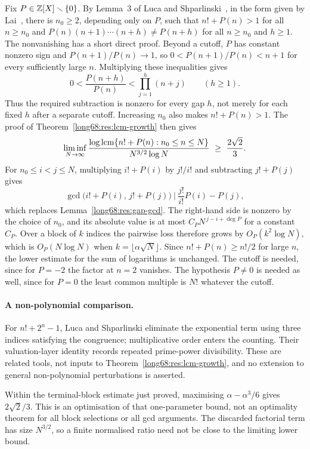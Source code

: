 \documentclass[11pt]{article}
\begin{document}
\begin{remark}
Fix $P\in\mathbb{Z}[X]\smallsetminus\{0\}$.  By Lemma~3 of Luca and
Shparlinski~\cite{luca-shparlinski}, in the form given by
Lai~\cite[Lemma~2.1]{lai}, there is $n_0\ge2$, depending only on $P$, such
that $n!+P(n)>1$ for all $n\ge n_0$ and $P(n)(n+1)\cdots(n+h)\ne P(n+h)$ for
all $n\ge n_0$ and $h\ge1$. The nonvanishing has a short direct proof.
Beyond a cutoff, $P$ has constant nonzero sign and
$P(n+1)/P(n)\to1$, so $0<P(n+1)/P(n)<n+1$ for every sufficiently
large $n$. Multiplying these inequalities gives
\[
 0<\frac{P(n+h)}{P(n)}<\prod_{j=1}^{h}(n+j)\qquad(h\ge1).
\]
Thus the required subtraction is nonzero for every gap $h$, not merely
for each fixed $h$ after a separate cutoff. Increasing $n_0$ also makes
$n!+P(n)>1$. The proof of Theorem~\ref{long68:res:lcm-growth} then gives
\[
 \liminf_{N\to\infty}
 \frac{\log\operatorname{lcm}\{n!+P(n):n_0\le n\le N\}}{N^{3/2}\log N}
 \ \ge\ \frac{2\sqrt2}{3}.
\]
For $n_0\le i<j\le N$, multiplying $i!+P(i)$ by $j!/i!$ and subtracting
$j!+P(j)$ gives
\[
 \gcd\bigl(i!+P(i),\,j!+P(j)\bigr)\ \Big|\ \frac{j!}{i!}P(i)-P(j),
\]
which replaces Lemma~\ref{long68:res:gap-gcd}.  The right-hand side is
nonzero by the choice of $n_0$, and its absolute value is at most
$C_PN^{\,j-i+\deg P}$ for a constant $C_P$.  Over a block of $k$ indices the
pairwise loss therefore grows by $O_P(k^2\log N)$, which is $O_P(N\log N)$
when $k=\lfloor\alpha\sqrt N\rfloor$.  Since $n!+P(n)\ge n!/2$ for large $n$,
the lower estimate for the sum of logarithms is unchanged.  The cutoff is
needed, since for $P=-2$ the factor at $n=2$ vanishes.  The hypothesis
$P\ne0$ is needed as well, since for $P=0$ the least common multiple is $N!$
whatever the cutoff.
\end{remark}

\paragraph{A non-polynomial comparison.}
For $n!+2^n-1$, Luca and Shparlinski
\cite[Lemmas~2.1--2.3, pp.~860--862]{luca-shparlinski-exp} eliminate the
exponential term using three indices satisfying the congruence; multiplicative order enters the counting.
Their valuation-layer identity \cite[(3.2), p.~863]{luca-shparlinski-exp}
records repeated prime-power divisibility.  These are related tools, not
inputs to Theorem~\ref{long68:res:lcm-growth}, and no extension to general
non-polynomial perturbations is asserted.

Within the terminal-block estimate just proved, maximising
$\alpha-\alpha^3/6$ gives $2\sqrt2/3$.  This is an optimisation of that
one-parameter bound, not an optimality theorem for all block selections or
all gcd arguments.  The discarded factorial term has size $N^{3/2}$,
so a finite normalised ratio need not be close to the limiting lower bound.
\end{document}

